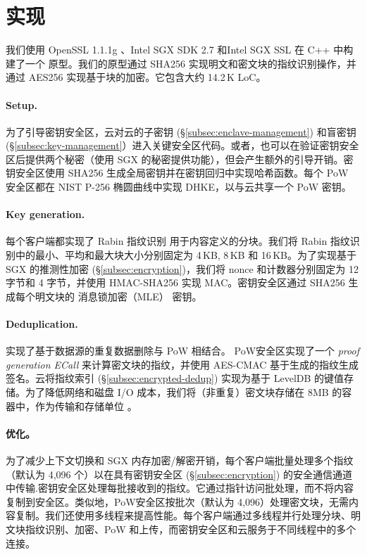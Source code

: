 \section{实现}
\label{sec:implementation}

我们使用 OpenSSL 1.1.1g \cite{openssl}、Intel SGX SDK 2.7 \cite{sgx} 和Intel SGX SSL \cite{sgxssl} 在 C++ 中构建了一个 \sysnameS 原型。我们的原型通过 SHA256 实现明文和密文块的指纹识别操作，并通过 AES256 实现基于块的加密。它包含大约 14.2\,K LoC。

\paragraph{Setup.} 
为了引导密钥安全区，云对云的子密钥 (\S\ref{subsec:enclave-management}) 和盲密钥 (\S\ref{subsec:key-management}）进入关键安全区代码。或者，\sysnameS 也可以在验证密钥安全区后提供两个秘密（使用 SGX \cite{sgx} 的秘密提供功能），但会产生额外的引导开销。密钥安全区使用 SHA256 生成全局密钥并在密钥回归中实现哈希函数。每个 PoW 安全区都在 NIST P-256 椭圆曲线中实现 DHKE，以与云共享一个 PoW 密钥。

\paragraph{Key generation.} 每个客户端都实现了 Rabin 指纹识别 \cite{rabin81} 用于内容定义的分块。我们将 Rabin 指纹识别中的最小、平均和最大块大小分别固定为 4\,KB, 8\,KB 和 16\,KB。为了实现基于 SGX 的推测性加密 (\S\ref{subsec:encryption})，我们将 nonce 和计数器分别固定为 12 字节和 4 字节，并使用 HMAC-SHA256 实现 MAC。密钥安全区通过 SHA256 生成每个明文块的 消息锁加密（MLE） 密钥。

\paragraph{Deduplication.} \sysnameS 实现了基于数据源的重复数据删除与 PoW 相结合。 PoW安全区实现了一个 \textit{ proof generation ECall} 来计算密文块的指纹，并使用 AES-CMAC 基于生成的指纹生成签名。云将指纹索引 (\S\ref{subsec:encrypted-dedup}) 实现为基于 LevelDB \cite{leveldb} 的键值存储。为了降低网络和磁盘 I/O 成本，我们将（非重复）密文块存储在 8MB 的容器中，作为传输和存储单位 \cite{lillibridge13}。

\paragraph{优化。} 为了减少上下文切换和 SGX 内存加密/解密开销，每个客户端批量处理多个指纹（默认为 4,096 个）以在具有密钥安全区 (\S\ref{subsec:encryption}) 的安全通信通道中传输.密钥安全区处理每批接收到的指纹。它通过指针访问批处理，而不将内容复制到安全区\cite{harnik18}。类似地，PoW安全区按批次（默认为 4,096）处理密文块，无需内容复制。我们还使用多线程来提高性能。每个客户端通过多线程并行处理分块、明文块指纹识别、加密、PoW 和上传，而密钥安全区和云服务于不同线程中的多个连接。